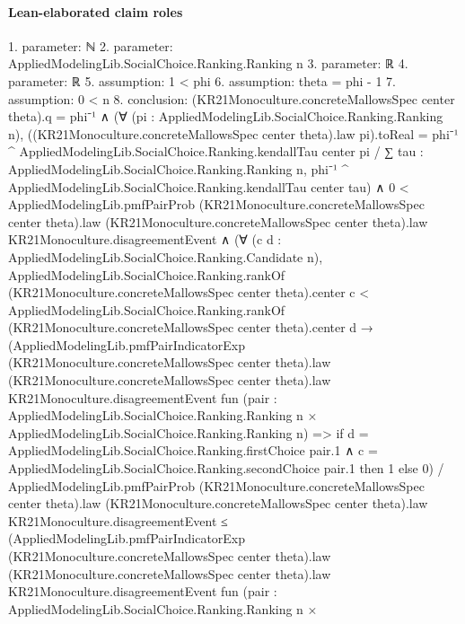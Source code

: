 \documentclass[10pt]{article}
\begin{document}
\paragraph{Lean-elaborated claim roles}\begin{ReviewVerbatim}
1. parameter: ℕ
2. parameter: AppliedModelingLib.SocialChoice.Ranking.Ranking n
3. parameter: ℝ
4. parameter: ℝ
5. assumption: 1 < phi
6. assumption: theta = phi - 1
7. assumption: 0 < n
8. conclusion: (KR21Monoculture.concreteMallowsSpec center theta).q = phi⁻¹ ∧
  (∀ (pi : AppliedModelingLib.SocialChoice.Ranking.Ranking n),
      ((KR21Monoculture.concreteMallowsSpec center theta).law pi).toReal =
        phi⁻¹ ^ AppliedModelingLib.SocialChoice.Ranking.kendallTau center pi /
          ∑ tau : AppliedModelingLib.SocialChoice.Ranking.Ranking n,
            phi⁻¹ ^ AppliedModelingLib.SocialChoice.Ranking.kendallTau center tau) ∧
    0 <
        AppliedModelingLib.pmfPairProb (KR21Monoculture.concreteMallowsSpec center theta).law
          (KR21Monoculture.concreteMallowsSpec center theta).law KR21Monoculture.disagreementEvent ∧
      (∀ (c d : AppliedModelingLib.SocialChoice.Ranking.Candidate n),
          AppliedModelingLib.SocialChoice.Ranking.rankOf (KR21Monoculture.concreteMallowsSpec center theta).center c <
              AppliedModelingLib.SocialChoice.Ranking.rankOf (KR21Monoculture.concreteMallowsSpec center theta).center
                d →
            (AppliedModelingLib.pmfPairIndicatorExp (KR21Monoculture.concreteMallowsSpec center theta).law
                  (KR21Monoculture.concreteMallowsSpec center theta).law KR21Monoculture.disagreementEvent
                  fun
                    (pair :
                      AppliedModelingLib.SocialChoice.Ranking.Ranking n ×
                        AppliedModelingLib.SocialChoice.Ranking.Ranking n) =>
                  if
                      d = AppliedModelingLib.SocialChoice.Ranking.firstChoice pair.1 ∧
                        c = AppliedModelingLib.SocialChoice.Ranking.secondChoice pair.1 then
                    1
                  else 0) /
                AppliedModelingLib.pmfPairProb (KR21Monoculture.concreteMallowsSpec center theta).law
                  (KR21Monoculture.concreteMallowsSpec center theta).law KR21Monoculture.disagreementEvent ≤
              (AppliedModelingLib.pmfPairIndicatorExp (KR21Monoculture.concreteMallowsSpec center theta).law
                  (KR21Monoculture.concreteMallowsSpec center theta).law KR21Monoculture.disagreementEvent
                  fun
                    (pair :
                      AppliedModelingLib.SocialChoice.Ranking.Ranking n ×

\end{ReviewVerbatim}
\end{document}
